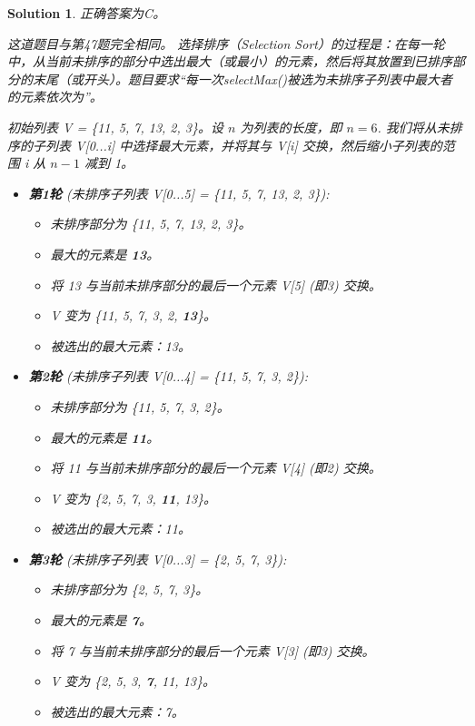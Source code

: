 \documentclass[UTF8]{report}
\newtheorem{solution}{Solution}
\theoremstyle{MyLineTheoremStyle} %
\theoremstyle{MyBlockTheoremStyle} %
\theoremstyle{MySubsubsectionStyle} %
\begin{document}
\begin{solution}
正确答案为C。

这道题目与第47题完全相同。
选择排序（Selection Sort）的过程是：在每一轮中，从当前未排序的部分中选出最大（或最小）的元素，然后将其放置到已排序部分的末尾（或开头）。题目要求“每一次selectMax()被选为未排序子列表中最大者的元素依次为”。

初始列表 V = \{11, 5, 7, 13, 2, 3\}。设 $n$ 为列表的长度，即 $n=6$.
我们将从未排序的子列表 V[0...i] 中选择最大元素，并将其与 V[i] 交换，然后缩小子列表的范围 i 从 $n-1$ 减到 1。

\begin{itemize}
    \item \textbf{第1轮} (未排序子列表 V[0...5] = \{11, 5, 7, 13, 2, 3\}):
    \begin{itemize}
        \item 未排序部分为 \{11, 5, 7, 13, 2, 3\}。
        \item 最大的元素是 \textbf{13}。
        \item 将 13 与当前未排序部分的最后一个元素 V[5] (即3) 交换。
        \item V 变为 \{11, 5, 7, 3, 2, \textbf{13}\}。
        \item 被选出的最大元素：13。
    \end{itemize}

    \item \textbf{第2轮} (未排序子列表 V[0...4] = \{11, 5, 7, 3, 2\}):
    \begin{itemize}
        \item 未排序部分为 \{11, 5, 7, 3, 2\}。
        \item 最大的元素是 \textbf{11}。
        \item 将 11 与当前未排序部分的最后一个元素 V[4] (即2) 交换。
        \item V 变为 \{2, 5, 7, 3, \textbf{11}, 13\}。
        \item 被选出的最大元素：11。
    \end{itemize}

    \item \textbf{第3轮} (未排序子列表 V[0...3] = \{2, 5, 7, 3\}):
    \begin{itemize}
        \item 未排序部分为 \{2, 5, 7, 3\}。
        \item 最大的元素是 \textbf{7}。
        \item 将 7 与当前未排序部分的最后一个元素 V[3] (即3) 交换。
        \item V 变为 \{2, 5, 3, \textbf{7}, 11, 13\}。
        \item 被选出的最大元素：7。
    \end{itemize}


\end{itemize}
\end{solution}
\end{document}
